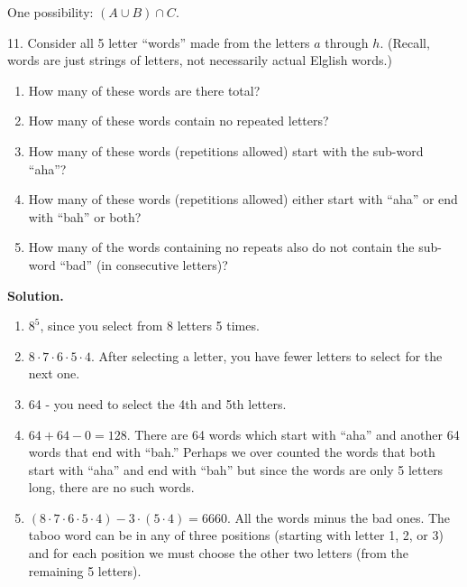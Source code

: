 \documentclass[10pt,]{book}
\theoremstyle{plain}
\theoremstyle{definition}
\theoremstyle{definition}
\theoremstyle{definition}
\numberwithin{equation}{section}
\begin{document}
\begin{exerciselist}
One possibility: \((A \cup B) \cap C\).
%
\item[11.]\hypertarget{exercise-52}{}
Consider all 5 letter ``words'' made from the letters \(a\) through \(h\). (Recall, words are just strings of letters, not necessarily actual Elglish words.)
%
\leavevmode%
\begin{enumerate}[label=(\alph*)]
\item\hypertarget{li-380}{}
How many of these words are there total?
%
\item\hypertarget{li-381}{}
How many of these words contain no repeated letters?
%
\item\hypertarget{li-382}{}
How many of these words (repetitions allowed) start with the sub-word ``aha''?
%
\item\hypertarget{li-383}{}
How many of these words (repetitions allowed) either start with ``aha'' or end with ``bah'' or both?
%
\item\hypertarget{li-384}{}
How many of the words containing no repeats also do not contain the sub-word ``bad'' (in consecutive letters)?
%
\end{enumerate}
\par\smallskip
\par\smallskip
\noindent\textbf{Solution.}\hypertarget{solution-75}{}\quad
\leavevmode%
\begin{enumerate}[label=(\alph*)]
\item\hypertarget{li-385}{}\(8^5\), since you select from 8 letters 5 times.\item\hypertarget{li-386}{}\(8\cdot 7\cdot 6\cdot 5\cdot 4\).  After selecting a letter, you have fewer letters to select for the next one.\item\hypertarget{li-387}{}
64 - you need to select the 4th and 5th letters.
%
\item\hypertarget{li-388}{}\(64 + 64 - 0 = 128\).  There are 64 words which start with ``aha'' and another 64 words that end with ``bah.''  Perhaps we over counted the words that both start with ``aha'' and end with ``bah'' but since the words are only 5 letters long, there are no such words.\item\hypertarget{li-389}{}\((8\cdot 7\cdot 6\cdot 5\cdot 4) - 3\cdot (5\cdot 4) = 6660\). All the words minus the bad ones.  The taboo word can be in any of three positions (starting with letter 1, 2, or 3) and for each position we must choose the other two letters (from the remaining 5 letters).\end{enumerate}
\end{exerciselist}
\end{document}
